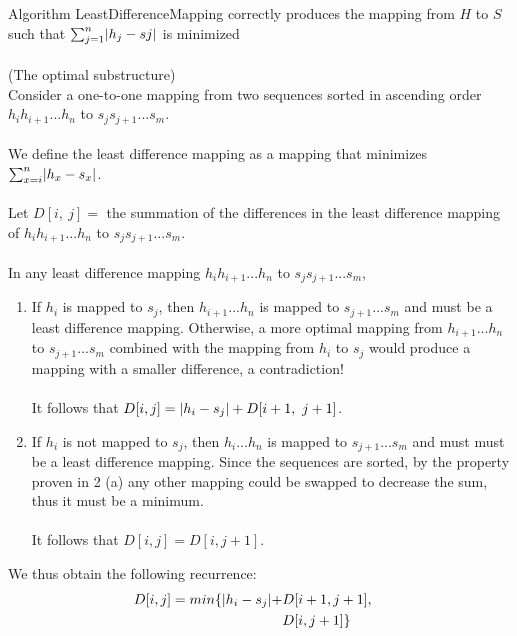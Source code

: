 \documentclass[12pt]{article}
\newenvironment{lemma}[2][Lemma]{\begin{trivlist}
\item[\hskip \labelsep {\bfseries #1}\hskip \labelsep {\bfseries #2.}]}{\end{trivlist}}
\newenvironment{question}[2][Question]{\begin{trivlist}
\item[\hskip \labelsep {\bfseries #1}\hskip \labelsep {\bfseries #2.}]}{\end{trivlist}}
\DeclarePairedDelimiter\abs{\lvert}{\rvert}%
\begin{document}
\begin{question}{2 (b)}
  \begin{lemma}{2.1} Algorithm LeastDifferenceMapping correctly produces the mapping from $H$ to $S$ such that $\sum_{j=1}^{n} \abs{h_{j} - s{j}}$ is minimized
    \leavevmode \\ \\
    (The optimal substructure) \\
    Consider a one-to-one mapping from two sequences sorted in ascending order\\
    $h_{i}h_{i+1}...h_{n}$ to $s_{j}s_{j+1}...s_{m}$. \\ \\
    We define the least difference mapping as a mapping that minimizes $\sum_{x=i}^{n} \abs{h_{x} - s_{x}}$. \\ \\
    Let $D[i,\ j] = $ the summation of the differences in the least difference mapping of $h_{i}h_{i+1}...h_{n}$ to $s_{j}s_{j+1}...s_{m}$. \\ \\
    In any least difference mapping $h_{i}h_{i+1}...h_{n}$ to $s_{j}s_{j+1}...s_{m}$,
    \begin{enumerate}
      \item If $h_{i}$ is mapped to $s_{j}$, then $h_{i+1}...h_{n}$ is mapped to
        $s_{j+1}...s_{m}$ and must be a least difference mapping.  Otherwise,
        a more optimal mapping from $h_{i+1}...h_{n}$ to $s_{j+1}...s_{m}$ combined
        with the mapping from $h_{i}$ to $s_{j}$ would produce a mapping with a
        smaller difference, a contradiction! \\ \\
        It follows that $D[i, j] = \abs{h_{i} - s_{j}} + D[i + 1,\ j + 1]$.

      \item If $h_{i}$ is not mapped to $s_{j}$, then $h_{i}...h_{n}$ is mapped
        to $s_{j+1}...s_{m}$ and must must be a least difference mapping.  Since
        the sequences are sorted, by the property proven in 2 (a) any other
        mapping could be swapped to decrease the sum, thus it must be a minimum. \\ \\
        It follows that $D[i, j] = D[i, j + 1]$.
    \end{enumerate}

    We thus obtain the following recurrence:
    \begin{align*}
      D[i, j] = min\{\abs{h_{i} - s_{j}} + & D[i + 1, j + 1], & \\
                                           & D[i, j + 1]\}
    \end{align*}


\end{lemma}
\end{question}
\end{document}
